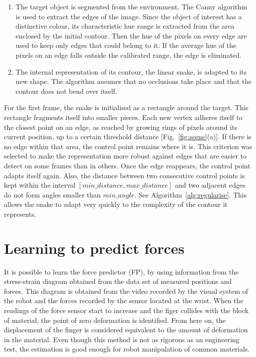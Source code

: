\documentclass[journal]{IEEEtran}
\newcommand{\fref}[1]{Fig.~\ref{#1}}
\newcommand{\alref}[1]{Algorithm~\ref{#1}}
\newcounter{algorithm}
\begin{document}
\begin{enumerate}
 \item The target object is segmented from the environment.  The Canny algorithm is used to extract the edges of the image.  Since the object of interest has a distinctive colour, its characteristic hue range is extracted from the area enclosed by the initial contour.  Then the hue of the pixels on every edge are used to keep only edges that could belong to it.  If the average hue of the pixels on an edge falls outside the calibrated range, the edge is eliminated.
 \item The internal representation of its contour, the linear snake, is adapted to its new shape.  The algorithm assumes that no occlusions take place and that the contour does not bend over itself.
\end{enumerate}
For the first frame, the snake is initialised as a rectangle around the target. This rectangle fragments itself into smaller pieces. Each new vertex adheres itself to the closest point on an edge, as reached by growing rings of pixels around its current position, up to a certain threshold distance [\fref{fig:scene}(a)].  If there is no edge within that area, the control point remains where it is. This criterion was selected to make the representation more robust against edges that are easier to detect on some frames than in others.  Once the edge reappears, the control point adapts itself again.  Also, the distance between two consecutive control points is kept within the interval $[min\_distance, max\_distance]$ and two adjacent edges do not form angles smaller than $min\_angle$.  See \alref{alg:regularise}.  This allows the snake to adapt very quickly to the complexity of the contour it represents.

\section{Learning to predict forces}
\label{sec:forces}

It is possible to learn the force predictor (FP), by using information from the stress-strain diagram obtained from the data set of measured positions and forces.  This diagram is obtained from the video recorded by the visual system of the robot and the forces recorded by the sensor located at the wrist.  When the readings of the force sensor start to increase and the figer collides with the block of material, the point of zero deformation is identified.  From here on, the displacement of the finger is considered equivalent to the amount of deformation in the material.  Even though this method is not as rigorous as an engineering test, the estimation is good enough for robot manipulation of common materials.
\end{document}
